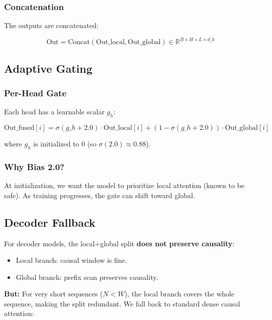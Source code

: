 \subsubsection{Concatenation}

The outputs are concatenated:

\[
\text{Out} = \text{Concat}(\text{Out}\_\text{local}, \text{Out}\_\text{global}) \in \mathbb{R}^{B \times H \times L \times d\_h}
\]

\subsection{Adaptive Gating}

\subsubsection{Per-Head Gate}

Each head has a learnable scalar $g_h$:

\[
\text{Out}\_\text{fused}[i] = \sigma(g\_h + 2.0) \cdot \text{Out}\_\text{local}[i] + (1 - \sigma(g\_h + 2.0)) \cdot \text{Out}\_\text{global}[i]
\]

where $g_h$ is initialized to 0 (so $\sigma(2.0) \approx 0.88$).

\subsubsection{Why Bias 2.0?}

At initialization, we want the model to prioritize local attention (known 
to be safe). As training progresses, the gate can shift toward global.

\subsection{Decoder Fallback}

For decoder models, the local+global split \textbf{does not preserve causality}:

\begin{itemize}
\item Local branch: causal window is fine.
\item Global branch: prefix scan preserves causality.

\end{itemize}
\textbf{But:} For very short sequences ($N < W$), the local branch covers the 
whole sequence, making the split redundant. We fall back to standard dense 
causal attention:

